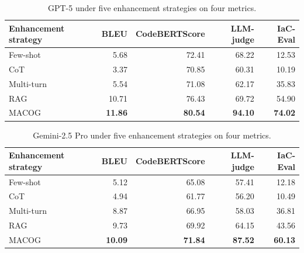 \documentclass[acmsmall,screen,review,anonymous]{acmart}
\begin{document}
\begin{table}[t]
\centering
\caption{GPT-5 under five enhancement strategies on four metrics.}
\label{tab:gpt5_metrics}
\small
\setlength{\tabcolsep}{6pt}
\begin{tabular}{@{}lrrrr@{}}
\toprule
\textbf{Enhancement strategy} & \textbf{BLEU} & \textbf{CodeBERTScore} & \textbf{LLM-judge} & \textbf{IaC-Eval} \\
\midrule
Few-shot     & 5.68  & 72.41 & 68.22 & 12.53 \\
CoT          & 3.37  & 70.85 & 60.31 & 10.19 \\
Multi-turn   & 5.54  & 71.08 & 62.17 & 35.83 \\
RAG          & 10.71 & 76.43 & 69.72 & 54.90 \\
MACOG        & \textbf{11.86} & \textbf{80.54} & \textbf{94.10} & \textbf{74.02} \\
\bottomrule
\end{tabular}
\end{table}


\begin{table}[t]
\centering
\caption{Gemini-2.5 Pro under five enhancement strategies on four metrics.}
\label{tab:gemini25_metrics}
\small
\setlength{\tabcolsep}{6pt}
\begin{tabular}{@{}lrrrr@{}}
\toprule
\textbf{Enhancement strategy} & \textbf{BLEU} & \textbf{CodeBERTScore} & \textbf{LLM-judge} & \textbf{IaC-Eval} \\
\midrule
Few-shot     & 5.12  & 65.08 & 57.41 & 12.18 \\
CoT          & 4.94  & 61.77 & 56.20 & 10.49 \\
Multi-turn   & 8.87  & 66.95 & 58.03 & 36.81 \\
RAG          & 9.73  & 69.92 & 64.15 & 43.56 \\
MACOG        & \textbf{10.09} & \textbf{71.84} & \textbf{87.52} & \textbf{60.13} \\
\bottomrule
\end{tabular}
\end{table}
\end{document}
